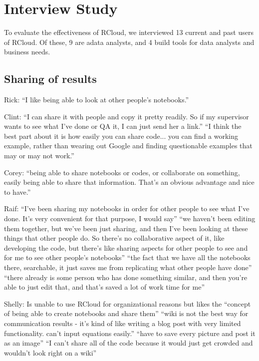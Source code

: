 \section{Interview Study\label{sec:interviews}}

To evaluate the effectiveness of RCloud, we interviewed 13 current and past users of RCloud. Of these, 9 are adata analysts, and 4 build tools for data analysts and business needs.



\subsection{Sharing of results}
Rick: ``I like being able to look at other people's notebooks.''

Clint: ``I can share it with people and copy it pretty readily. So if my supervisor wants to see what I've done or QA it, I can just send her a link.'' ``I think the best part about it is how easily you can share code... you can find a working example, rather than wearing out Google and finding questionable examples that may or may not work.''

Corey: ``being able to share notebooks or codes, or collaborate on something, easily being able to share that information. That's an obvious advantage and nice to have.''

Raif: ``I've been sharing my notebooks in order for other people to see what I've done. It's very convenient for that purpose, I would say'' ``we haven't been editing them together, but we've been just sharing, and then I've been looking at these things that other people do. So there's no collaborative aspect of it, like developing the code, but there's like sharing aspects for other people to see and for me to see other people's notebooks'' ``the fact that we have all the notebooks there, searchable, it just saves me from replicating what other people have done'' ``there already is some person who has done something similar, and then you're able to just edit that, and that's saved a lot of work time for me''

Shelly: Is unable to use RCloud for organizational reasons but likes the ``concept of being able to create notebooks and share them'' ``wiki is not the best way for communication results - it's kind of like writing a blog post with very limited functionality. can't input equations easily.'' ``have to save every picture and post it as an image'' ``I can't share all of the code because it would just get crowded and wouldn't look right on a wiki''


